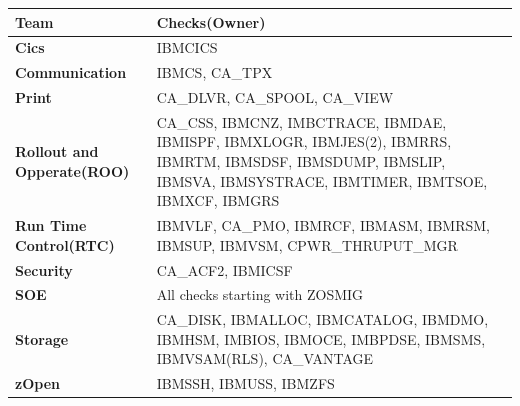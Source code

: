 \begin{table}[h]
	\begin{tabular}{|l|p{9cm}|}
		\hline
		\textbf{Team}                      & \textbf{Checks(Owner)}                                                                                                                                                 \\ \hline
		\textbf{Cics}                      & IBMCICS                                                                                                                                                                \\ \hline
		\textbf{Communication}             & IBMCS, CA\_TPX                                                                                                                                                         \\ \hline
		\textbf{Print}                     & CA\_DLVR, CA\_SPOOL, CA\_VIEW                                                                                                                                          \\ \hline
		\textbf{Rollout and Opperate(ROO)} & CA\_CSS, IBMCNZ,  IMBCTRACE, IBMDAE, IBMISPF, IBMXLOGR, IBMJES(2), IBMRRS, IBMRTM, IBMSDSF, IBMSDUMP, IBMSLIP, IBMSVA, IBMSYSTRACE, IBMTIMER, IBMTSOE,  IBMXCF, IBMGRS \\ \hline
		\textbf{Run Time Control(RTC)}     & IBMVLF, CA\_PMO, IBMRCF, IBMASM, IBMRSM, IBMSUP, IBMVSM,  CPWR\_THRUPUT\_MGR                                                                                           \\ \hline
		\textbf{Security}                  & CA\_ACF2, IBMICSF                                                                                                                                                      \\ \hline
		\textbf{SOE}                       & All checks starting with ZOSMIG                                                                                                                                        \\ \hline
		\textbf{Storage}                   & CA\_DISK, IBMALLOC, IBMCATALOG, IBMDMO, IBMHSM, IMBIOS, IBMOCE, IMBPDSE, IBMSMS, IBMVSAM(RLS), CA\_VANTAGE                                                             \\ \hline
		\textbf{zOpen}                     & IBMSSH, IBMUSS, IBMZFS                                                                                                                                                 \\ \hline

\end{tabular}
\end{table}
